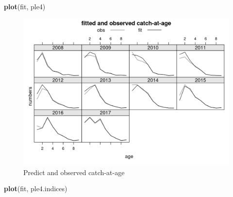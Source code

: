 \documentclass[
]{book}
\newenvironment{Shaded}{\begin{snugshade}}{\end{snugshade}}
\newcommand{\FunctionTok}[1]{\textcolor[rgb]{0.13,0.29,0.53}{\textbf{#1}}}
\newcommand{\NormalTok}[1]{#1}
\begin{document}
\begin{Shaded}
\begin{Highlighting}[]
\FunctionTok{plot}\NormalTok{(fit, ple4)}
\end{Highlighting}
\end{Shaded}

\begin{figure}
\centering
\includegraphics{_bookdown_files/_main_files/figure-html/selplt-1.png}
\caption{\label{fig:selplt}Predict and observed catch-at-age}
\end{figure}

\begin{Shaded}
\begin{Highlighting}[]
\FunctionTok{plot}\NormalTok{(fit, ple4.indices)}
\end{Highlighting}
\end{Shaded}
\end{document}

